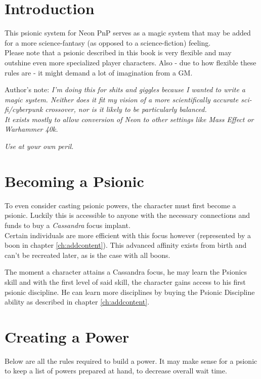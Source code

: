 \documentclass[12pt,a4paper,openany,usenames,dvipsnames]{book}
\begin{document}
	

	\chapter{Introduction}
	This psionic system for Neon PnP serves as a magic system that may be added for a more science-fantasy (as opposed to a science-fiction) feeling.\\
	Please note that a psionic described in this book is very flexible and may outshine even more specialized player characters. Also - due to how flexible these rules are - it might demand a lot of imagination from a GM.

	Author's note: \emph{I'm doing this for shits and giggles because I wanted to write a magic system. Neither does it fit my vision of a more scientifically accurate sci-fi/cyberpunk crossover, nor is it likely to be particularly balanced.\\
		It exists mostly to allow conversion of Neon to other settings like Mass Effect or Warhammer 40k.}
		\par
		\emph{Use at your own peril.}

	\chapter{Becoming a Psionic}
	To even consider casting psionic powers, the character must first become a psionic. Luckily this is accessible to anyone with the necessary connections and funds to buy a \emph{Cassandra} focus implant.\\
	Certain individuals are more efficient with this focus however (represented by a boon in chapter \ref{ch:addcontent}). This advanced affinity exists from birth and can't be recreated later, as is the case with all boons. \par
	The moment a character attains a Cassandra focus, he may learn the Psionics skill and with the first level of said skill, the character gains access to his first psionic discipline. He can learn more disciplines by buying the Psionic Discipline ability as described in chapter \ref{ch:addcontent}.

	\chapter{Creating a Power}
	\label{ch:create}
	Below are all the rules required to build a power. It may make sense for a psionic to keep a list of powers prepared at hand, to decrease overall wait time.
\end{document}
